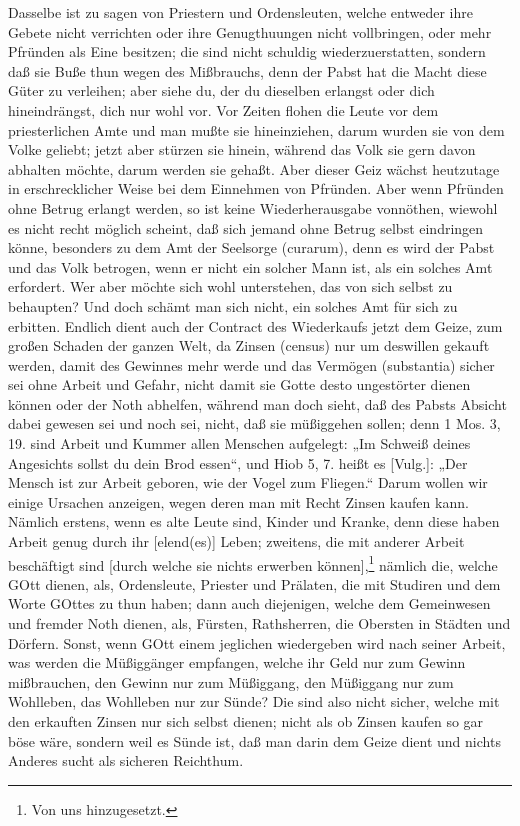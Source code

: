 Dasselbe ist zu sagen von Priestern und Ordensleuten, welche entweder ihre Gebete nicht verrichten oder ihre Genugthuungen nicht vollbringen, oder mehr Pfründen als Eine besitzen; die sind nicht schuldig wiederzuerstatten, sondern daß sie Buße thun wegen des Mißbrauchs, denn der Pabst hat die Macht diese Güter zu verleihen; aber siehe du, der du dieselben erlangst oder dich hineindrängst, dich nur wohl vor. Vor Zeiten flohen die Leute vor dem priesterlichen Amte und man mußte sie hineinziehen, darum wurden sie von dem Volke geliebt; jetzt aber stürzen sie hinein, während das Volk sie gern davon abhalten möchte, darum werden sie gehaßt. Aber dieser Geiz wächst heutzutage in erschrecklicher Weise bei dem Einnehmen von Pfründen. Aber wenn Pfründen ohne Betrug erlangt werden, so ist keine Wiederherausgabe vonnöthen, wiewohl es nicht recht möglich scheint, daß sich jemand ohne Betrug selbst eindringen könne, besonders zu dem Amt der Seelsorge (curarum),
denn es wird der Pabst und das Volk betrogen, wenn er nicht ein solcher Mann ist, als ein solches Amt erfordert. Wer aber möchte sich wohl unterstehen, das von sich selbst zu behaupten? Und doch schämt man sich nicht, ein solches Amt für sich zu erbitten. Endlich dient auch der Contract des Wiederkaufs jetzt dem Geize, zum großen Schaden der ganzen Welt, da Zinsen (census) nur um deswillen gekauft werden, damit des Gewinnes mehr werde und das Vermögen (substantia) sicher sei ohne Arbeit und Gefahr, nicht damit sie Gotte desto ungestörter dienen können oder der Noth abhelfen, während man doch sieht, daß des Pabsts Absicht dabei gewesen sei und noch sei, nicht, daß sie müßiggehen sollen; denn 1 Mos. 3, 19. sind Arbeit und Kummer allen Menschen aufgelegt: „Im Schweiß deines Angesichts sollst du dein Brod essen“, und Hiob 5, 7. heißt es [Vulg.]: „Der Mensch ist zur Arbeit geboren, wie der Vogel zum Fliegen.“ Darum wollen wir einige Ursachen anzeigen, wegen deren man mit Recht Zinsen kaufen kann. Nämlich erstens, wenn es alte Leute sind, Kinder und Kranke, denn diese haben Arbeit genug durch ihr [elend(es)] Leben; zweitens, die mit anderer Arbeit beschäftigt sind [durch welche sie nichts erwerben können],\footnote{Von uns hinzugesetzt.} nämlich die, welche GOtt dienen, als, Ordensleute, Priester und Prälaten, die mit Studiren und dem Worte GOttes zu thun haben; dann auch diejenigen, welche dem Gemeinwesen und fremder Noth dienen, als, Fürsten, Rathsherren, die Obersten in Städten und Dörfern. Sonst, wenn GOtt einem jeglichen wiedergeben wird nach seiner Arbeit, was werden die Müßiggänger empfangen, welche ihr Geld nur zum Gewinn mißbrauchen, den Gewinn nur zum Müßiggang, den Müßiggang nur zum Wohlleben, das Wohlleben nur zur Sünde? Die sind also nicht sicher, welche mit den erkauften Zinsen nur sich selbst dienen; nicht als ob Zinsen kaufen so gar böse wäre, sondern weil es Sünde ist, daß man darin dem Geize dient und nichts Anderes sucht als sicheren Reichthum.

